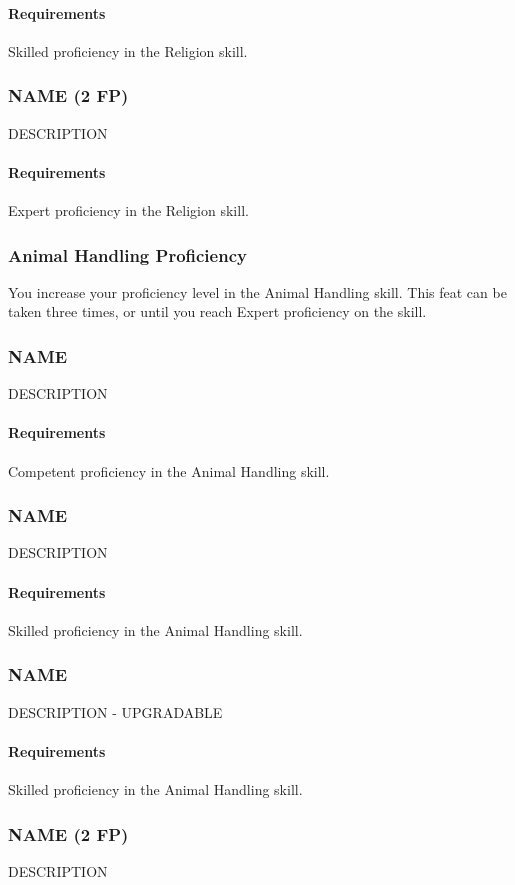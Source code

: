     \paragraph{Requirements} Skilled proficiency in the Religion skill.
\subsubsection{NAME (2 FP)} \label{feat::name}
    DESCRIPTION
    \paragraph{Requirements} Expert proficiency in the Religion skill.
\subsubsection{Animal Handling Proficiency} \label{feat::animalhandlingprof}
    You increase your proficiency level in the Animal Handling skill.
    This feat can be taken three times, or until you reach Expert proficiency on the skill.
\subsubsection{NAME} \label{feat::name}
    DESCRIPTION
    \paragraph{Requirements} Competent proficiency in the Animal Handling skill.
\subsubsection{NAME} \label{feat::name}
    DESCRIPTION
    \paragraph{Requirements} Skilled proficiency in the Animal Handling skill.
\subsubsection{NAME} \label{feat::name}
    DESCRIPTION - UPGRADABLE
    \paragraph{Requirements} Skilled proficiency in the Animal Handling skill.
\subsubsection{NAME (2 FP)} \label{feat::name}
    DESCRIPTION
